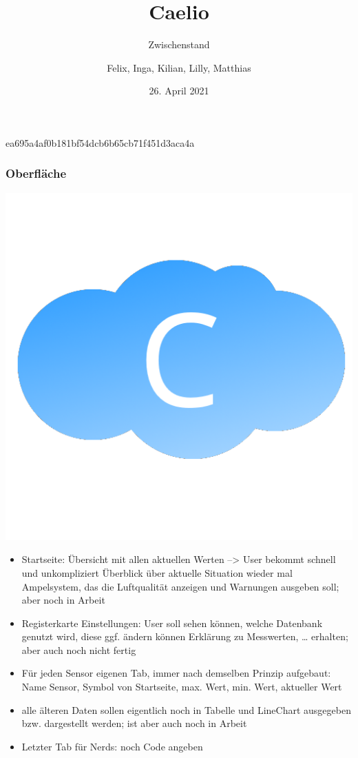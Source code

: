 \documentclass[notes]{beamer}
\title{Caelio}
\subtitle{Zwischenstand}
\author{Felix, Inga, Kilian, Lilly, Matthias}
\date{26. April 2021}
\begin{document}
	\begin{frame}
		\titlepage
	\end{frame}
	\begin{frame}
		\centering
		ea695a4af0b181bf54dcb6b65cb71f451d3aca4a
	\end{frame}
	\begin{frame}
		\frametitle{Oberfläche}
		\thispagestyle{empty}
		\centering
		\includegraphics[height = .5\textheight]{../../Anwendung/Icons/caelio}
	\end{frame}
	\note
	{
		\begin{itemize}
			\item Startseite: Übersicht mit allen aktuellen Werten --> User bekommt schnell und unkompliziert Überblick über aktuelle Situation 
			wieder mal Ampelsystem, das die Luftqualität anzeigen und Warnungen ausgeben soll; aber noch in Arbeit
			\item Registerkarte Einstellungen: User soll sehen können, welche Datenbank genutzt wird, diese ggf. ändern können 
			Erklärung zu Messwerten, … erhalten; aber auch noch nicht fertig
			\item Für jeden Sensor eigenen Tab, immer nach demselben Prinzip aufgebaut: Name Sensor, Symbol von Startseite, max. Wert, min. Wert, aktueller Wert
			\item alle älteren Daten sollen eigentlich noch in Tabelle und LineChart ausgegeben bzw. dargestellt werden; ist aber auch noch in Arbeit
			\item Letzter Tab für Nerds: noch Code angeben
		\end{itemize}
	}
\end{document}

